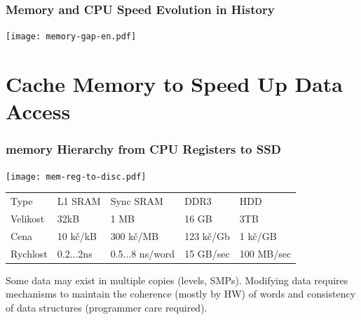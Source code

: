\documentclass{beamer}
\begin{document}
\begin{frame}
\frametitle{Memory and CPU Speed Evolution in History}

\centering

\texttt{[image: memory-gap-en.pdf]}

\end{frame}

\section{Cache Memory to Speed Up Data Access}

\begin{frame}
\frametitle{memory Hierarchy from CPU Registers to SSD}

{
\centering

\texttt{[image: mem-reg-to-disc.pdf]}

}
\vskip 2mm

\begin{tabular}{l|llll}
Type     & L1 SRAM   & Sync SRAM &  DDR3      & HDD \\
Velikost & 32kB      & 1 MB      &  16 GB     & 3TB \\
Cena     & 10 kč/kB  & 300 kč/MB &  123 kč/Gb & 1 kč/GB \\
Rychlost & 0.2...2ns & 0.5...8 ns/word & 15 GB/sec & 100 MB/sec \\
\end{tabular}

\vskip 2mm

Some data may exist in multiple copies (levels, SMPs).
Modifying data requires mechanisms to maintain the coherence (mostly by HW) of words and consistency of data structures (programmer care required).

\end{frame}
\end{document}
